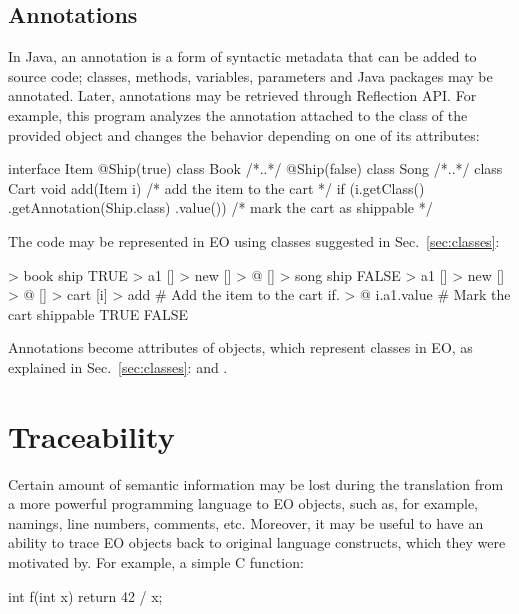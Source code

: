 \documentclass[sigplan,11pt,nonacm,natbib=false]{acmart}
\begin{document}
\subsection{Annotations}
\label{sec:annotations}

In Java, an annotation is a form of syntactic metadata that can be added to source code; classes, methods, variables, parameters and Java packages may be annotated. Later, annotations may be retrieved through Reflection API. For example, this program analyzes the annotation attached to the class of the provided object and changes the behavior depending on one of its attributes:

\begin{ffcode}
interface Item {}
@Ship(true) class Book { /*..*/ }
@Ship(false) class Song { /*..*/ }
class Cart {
  void add(Item i) {
    /* add the item to the cart */
    if (i.getClass()
      .getAnnotation(Ship.class)
      .value()) {
      /* mark the cart as shippable */
    }
  }
}
\end{ffcode}

The code may be represented in EO using classes suggested in Sec.~\ref{sec:classes}:

\begin{ffcode}
[] > book
  ship TRUE > a1
  [] > new
    [] > @
[] > song
  ship FALSE > a1
  [] > new
    [] > @
[] > cart
  [i] > add
    # Add the item to the cart
    if. > @
      i.a1.value
        # Mark the cart shippable
        TRUE
        FALSE
\end{ffcode}

Annotations become attributes of objects, which represent classes in EO, as explained in Sec.~\ref{sec:classes}:  and .

\section{Traceability}

Certain amount of semantic information may be lost during the translation from a more powerful programming language to EO objects, such as, for example, namings, line numbers, comments, etc. Moreover, it may be useful to have an ability to trace EO objects back to original language constructs, which they were motivated by. For example, a simple C function: 

\begin{ffcode}
int f(int x) {
  return 42 / x;
}
\end{ffcode}
\end{document}
